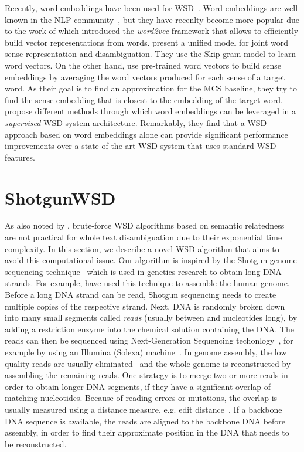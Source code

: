 \documentclass[11pt]{article}
\begin{document}
Recently, word embeddings have been used for WSD~\cite{Chen-EMNLP-2014,Bhingardive-NAACL-2015,Navigli-ACL-2016}. Word embeddings are well known in the NLP community~\cite{Bengio-JMLR-2003,Collobert-ICML-2008}, but they have recenlty become more popular due to the work of  which introduced the \emph{word2vec} framework that allows to efficiently build vector representations from words.  present a unified model for joint word sense representation and disambiguation. They use the Skip-gram model to learn word vectors. On the other hand,  use pre-trained word vectors to build sense embeddings by averaging the word vectors produced for each sense of a target word. As their goal is to find an approximation for the MCS baseline, they try to find the sense embedding that is closest to the embedding of the target word.  propose different methods through which word embeddings can be leveraged in a \emph{supervised} WSD system architecture. Remarkably, they find that a WSD approach based on word embeddings alone can provide significant performance improvements over a state-of-the-art WSD system that uses standard WSD features.

\section{ShotgunWSD}
\label{sec_ShotgunWSD} 

As also noted by , brute-force WSD algorithms based on semantic relatedness~\cite{Patwardhan-CICLing-2003} are not practical for whole text disambiguation due to their exponential time complexity. In this section, we describe a novel WSD algorithm that aims to avoid this computational issue. 
Our algorithm is inspired by the Shotgun genome sequencing technique~\cite{Shotgun-1981} which is used in genetics research to obtain long DNA strands. For example,  have used this technique to assemble the human genome. Before a long DNA strand can be read, Shotgun sequencing needs to create multiple copies of the respective strand. Next, DNA is randomly broken down into many small segments called \emph{reads} (usually between  and  nucleotides long), by adding a restriction enzyme into the chemical solution containing the DNA. The reads can then be sequenced using Next-Generation Sequencing techonlogy~\cite{Karl-NGS-2009}, for example by using an Illumina (Solexa) machine~\cite{Solexa-2004}. In genome assembly, the low quality reads are usually eliminated~\cite{NGS-QC-PLoS-2012} and the whole genome is reconstructed by assembling the remaining reads. One strategy is to merge two or more reads in order to obtain longer DNA segments, if they have a significant overlap of matching nucleotides. Because of reading errors or mutations, the overlap is usually measured using a distance measure, e.g. edit distance~\cite{levenshtein-1966}. If a backbone DNA sequence is available, the reads are aligned to the backbone DNA before assembly, in order to find their approximate position in the DNA that needs to be reconstructed.
\end{document}
